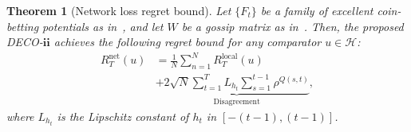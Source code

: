 \documentclass[journal]{IEEEtran} %
\newtheorem{theorem}{Theorem}
\newcommand{\Hil}{\mathcal{H}} %
\newcommand{\algname}{{DECO}\xspace}
\begin{document}
\begin{theorem}
    [Network loss regret bound]\label{thm:network_loss_regret_bound}
    Let $\{F_t\}$ be a family of excellent coin-betting potentials as in~, and let $W$ be a gossip matrix as in~.
    Then, the proposed \algname{}-$\pmb{ii}$ achieves the following regret bound for any comparator $u \in \Hil$:
    \begin{align*}
        R_T^{\text{net}}(u) & = \frac{1}{N} \sum_{n=1}^{N} R_T^{\text{local}}(u)                                                  \\
                            & + \underbrace{2\sqrt{N} \sum_{t=1}^T L_{h_t} \sum_{s=1}^{t-1} \rho^{Q(s,t)}}_{\text{Disagreement}},
    \end{align*}
    where $L_{h_t}$ is the Lipschitz constant of $h_t$ in $[-(t-1),(t-1)]$.
\end{theorem}
\end{document}
